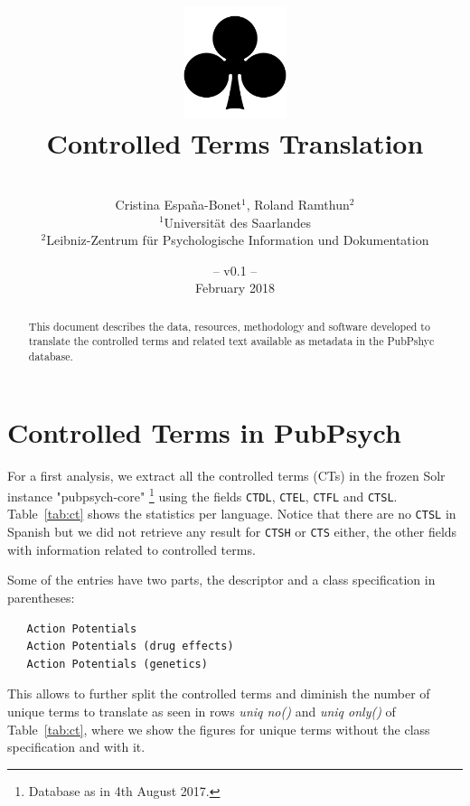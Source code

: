 \documentclass[a4paper,11pt]{article}
\title{
\includegraphics[width=3cm]{./img/200px-SuitClubs.png} \\
\Huge Controlled Terms Translation \\ 
}
\author{\vspace*{1cm}\\ \LARGE Cristina Espa\~na-Bonet$^{1}$, Roland Ramthun$^{2}$ \medskip \\ 
                        \Large $^{1}$Universit\"at des Saarlandes\\ \Large $^{2}$Leibniz-Zentrum für Psychologische Information und Dokumentation}
\date{\vspace*{2cm} -- v0.1 --\\February 2018}
\begin{document}
\clearpage\maketitle
\thispagestyle{empty}

\vspace*{5cm}
\begin{abstract}
This document describes the data, resources, methodology and software developed to translate the controlled terms and related text available as metadata in the PubPshyc database.
\end{abstract}

\newpage
\tableofcontents
\clearpage



\section{Controlled Terms in PubPsych}
\label{s:ct}

For a first analysis, we extract all the controlled terms (CTs) in the frozen Solr instance "pubpsych-core"%
\footnote{Database as in 4th August 2017.}  using the fields {\tt CTDL}, {\tt CTEL}, {\tt CTFL} and {\tt CTSL}. Table~\ref{tab:ct} shows the statistics per language. Notice that there are no {\tt CTSL} in Spanish but we did not retrieve any result for {\tt CTSH} or {\tt CTS} either, the other fields with information related to controlled terms.

Some of the entries have two parts, the descriptor and a class specification in parentheses:
{\small 
\begin{verbatim}
   Action Potentials
   Action Potentials (drug effects)
   Action Potentials (genetics)
\end{verbatim}
}

This allows to further split the controlled terms and diminish the number of unique terms to translate as seen in rows \emph{uniq no()} and \emph{uniq only()} of Table~\ref{tab:ct}, where we show the figures for unique terms without the class specification and with it.
\end{document}
